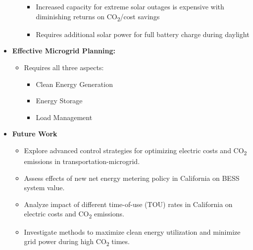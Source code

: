 \documentclass[aspectratio=169, 8 pt]{beamer}
\begin{document}
\begin{frame}[allowframebreaks]
\begin{itemize}
\begin{itemize}
\begin{itemize}
					\item Increased capacity for extreme solar outages is expensive with diminishing returns on CO\textsubscript{2}/cost savings
					\item Requires additional solar power for full battery charge during daylight
				\end{itemize}
			\end{itemize}
			\framebreak
			\item \textbf{Effective Microgrid Planning:}
			\begin{itemize} \large
				\item Requires all three aspects:
				\begin{itemize} \large
					\item Clean Energy Generation
					\item Energy Storage
					\item Load Management
				\end{itemize}
			\end{itemize}
		\item \textbf{Future Work}
			\begin{itemize} \large
				\item Explore advanced control strategies for optimizing electric costs and CO\textsubscript{2} emissions in transportation-microgrid.
				\item Assess effects of new net energy metering policy in California on BESS system value.
				\item Analyze impact of different time-of-use (TOU) rates in California on electric costs and CO\textsubscript{2} emissions.
				\item Investigate methods to maximize clean energy utilization and minimize grid power during high CO\textsubscript{2} times.
			\end{itemize}
		\end{itemize}
	\end{frame}
		
\end{document}

